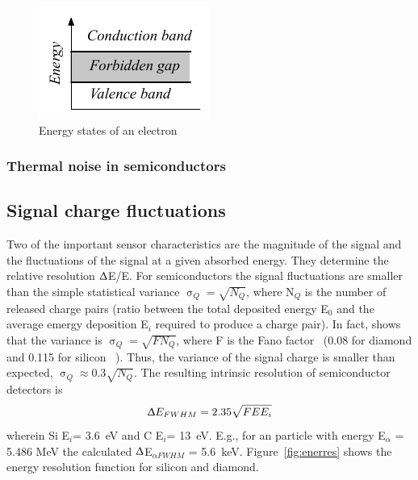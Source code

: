 \documentclass[12pt]{mytustyle}  %
\begin{document}
\begin{figure}[!t]
\begin{center}
\includegraphics[width=0.4\linewidth]{plots/energygap}
\caption{Energy states of an electron}
\label{fig:energygap}
\end{center}
\end{figure}




\subsubsection{Thermal noise in semiconductors}







\subsection{Signal charge fluctuations}
Two of the important sensor characteristics are the magnitude of the signal and the fluctuations of the signal at a given absorbed energy. They determine the relative resolution $\Updelta$E/E. For semiconductors the signal fluctuations are smaller than the simple statistical variance $\upsigma_Q=\sqrt{N_Q}$, where N$_Q$ is the number of released charge pairs (ratio between the total deposited energy E$_0$ and the average emergy deposition E$_i$ required to produce a charge pair). In fact, \cite{} shows that the variance is $\upsigma_Q=\sqrt{F N_Q}$, where F is the Fano factor~\cite{} (0.08 for diamond and 0.115 for silicon ~\cite{}). Thus, the variance of the signal charge is smaller than expected, $\upsigma_Q\approx0.3 \sqrt{N_Q}$. The resulting intrinsic resolution of semiconductor detectors is 
\begin{equation}
\label{eq:efwhm}
\Updelta E_{FWHM} = 2.35 \sqrt{FEE_i} 
\end{equation} 
wherein Si E$_i$= 3.6~eV and C E$_i$= 13~eV. E.g., for an \ga particle with energy E$_\alpha$ = 5.486 MeV the calculated $\Updelta$E$_{\alpha FWHM}$ = 5.6~keV. Figure~\ref{fig:enerres} shows the energy resolution function for silicon and diamond.
\end{document}
